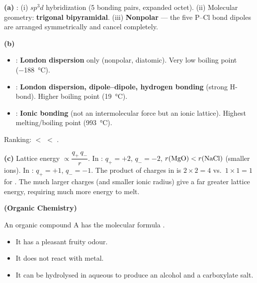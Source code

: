 \documentclass[addpoints]{exam}
\begin{document}
\begin{questions}
\begin{solution}[10cm]
\textbf{(a)} : (i) \textbf{$sp^3d$} hybridization (5 bonding pairs, expanded octet).
(ii) Molecular geometry: \textbf{trigonal bipyramidal}. (iii) \textbf{Nonpolar} --- the five
P--Cl bond dipoles are arranged symmetrically and cancel completely.

\textbf{(b)}
\begin{itemize}
    \item {}: \textbf{London dispersion} only (nonpolar, diatomic). Very low boiling point
    (\SI{-188}{\celsius}).
    \item {}: \textbf{London dispersion, dipole--dipole, hydrogen bonding} (strong H-bond).
    Higher boiling point (\SI{19}{\celsius}).
    \item {}: \textbf{Ionic bonding} (not an intermolecular force but an ionic lattice).
    Highest melting/boiling point (\SI{993}{\celsius}).
\end{itemize}
Ranking:  $<$  $<$ .

\textbf{(c)} Lattice energy $\propto \dfrac{q_+\,q_-}{r}$. In : $q_+ = +2$,
$q_- = -2$, $r(\ce{MgO}) < r(\ce{NaCl})$ (smaller ions). In : $q_+ = +1$,
$q_- = -1$. The product of charges in  is $2\times2 = 4$ vs.\ $1\times1 = 1$ for
. The much larger charges (and smaller ionic radius) give  a far greater
lattice energy, requiring much more energy to melt.
\end{solution}

\question \textbf{(Organic Chemistry)}

An organic compound A has the molecular formula .
\begin{itemize}
    \item It has a pleasant fruity odour.
    \item It does not react with  metal.
    \item It can be hydrolysed in aqueous  to produce an alcohol and a carboxylate
    salt.
\end{itemize}
\begin{parts}

\end{parts}
\end{questions}
\end{document}
